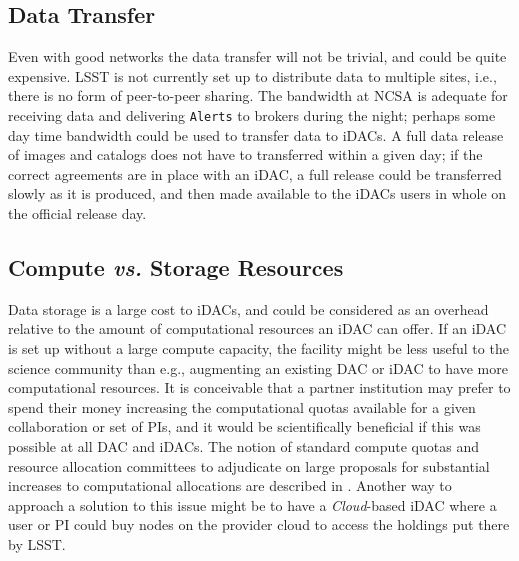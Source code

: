 \subsection{Data Transfer}
Even with good networks the data transfer will not be trivial, and could be quite expensive. LSST is not currently set up to distribute data to multiple sites, i.e., there is no form of peer-to-peer sharing. The bandwidth at NCSA is adequate for receiving data and delivering {\tt Alerts} to brokers during the night; perhaps some day time bandwidth could be used to transfer data to iDACs. A full data release of images and catalogs does not have to transferred within a given day; if the correct agreements are in place with an iDAC, a full release could be transferred slowly as it is produced, and then made available to the iDACs users in whole on the official release day.


\subsection{Compute {\it vs.} Storage Resources}
Data storage is a large cost to iDACs, and could be considered as an overhead relative to the amount of computational resources an iDAC can offer. If an iDAC is set up without a large compute capacity, the facility might be less useful to the science community than e.g., augmenting an existing DAC or iDAC to have more computational resources. It is conceivable that a partner institution may prefer to spend their money increasing the computational quotas available for a given collaboration or set of PIs, and it would be scientifically beneficial if this was possible at all DAC and iDACs. The notion of standard compute quotas and resource allocation committees to adjudicate on large proposals for substantial increases to computational allocations are described in . Another way to approach a solution to this issue might be to have a \emph{Cloud}-based iDAC where a user or PI could buy nodes on the provider cloud to access the holdings put there by LSST.
